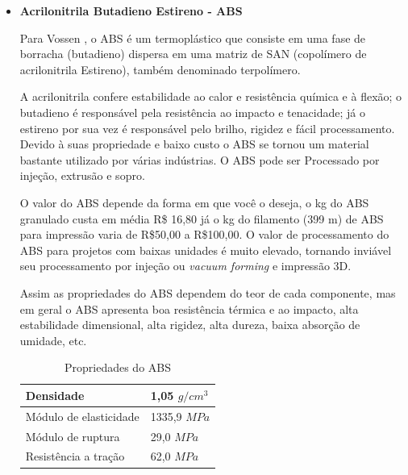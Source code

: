 \begin{itemize}
    \item \textbf{Acrilonitrila Butadieno Estireno - ABS}
    
    \par Para  Vossen  \cite{vossen2009nanocompositos},  o  ABS é  um  termoplástico  que  consiste em uma  fase  de  borracha  (butadieno)  dispersa  em  uma  matriz de  SAN  (copolímero  de  acrilonitrila  Estireno),  também denominado terpolímero.
    
	\par A acrilonitrila confere estabilidade ao calor e resistência química e à flexão; o butadieno é responsável pela resistência ao impacto e tenacidade; já o estireno por sua vez é responsável pelo brilho, rigidez e fácil processamento. Devido à suas propriedade e baixo custo o ABS se tornou um material bastante utilizado por várias indústrias. O ABS pode ser Processado por injeção, extrusão e sopro.
	
	\par O valor do ABS depende da forma em que você o deseja, o kg do ABS granulado custa em média R\$ 16,80 já o kg do filamento (399 m) de ABS para impressão varia de R\$50,00 a R\$100,00. O valor de processamento do ABS para projetos com baixas unidades é muito elevado, tornando inviável seu processamento por injeção ou \textit{vacuum forming} e impressão 3D.
	
	\par Assim as propriedades do ABS dependem do teor de cada componente, mas em geral o ABS apresenta boa resistência térmica e ao impacto, alta estabilidade dimensional, alta rigidez, alta dureza, baixa absorção de umidade, etc. \cite{junior2014aspectos}

    \begin{table}[h]
\centering
\begin{tabular}{|l|l|}
\hline
Densidade              & 1,05 $g/cm^3$ \\ \hline
Módulo de elasticidade & 1335,9 $MPa$ \\ \hline
Módulo de ruptura      & 29,0 $MPa$ \\ \hline
Resistência a tração   & 62,0 $MPa$ \\ \hline
\end{tabular}
\caption{Propriedades do ABS}
\label{tab:ABS}
\end{table}

\end{itemize}

